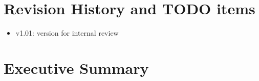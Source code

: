 \documentclass[12pt]{article}
\begin{document}
\newpage
\section {Revision History and TODO items}

\begin{itemize}
\item
  v1.01: version for internal review
\end{itemize}

% 
\newpage
\section {Executive Summary}
\end{document}
